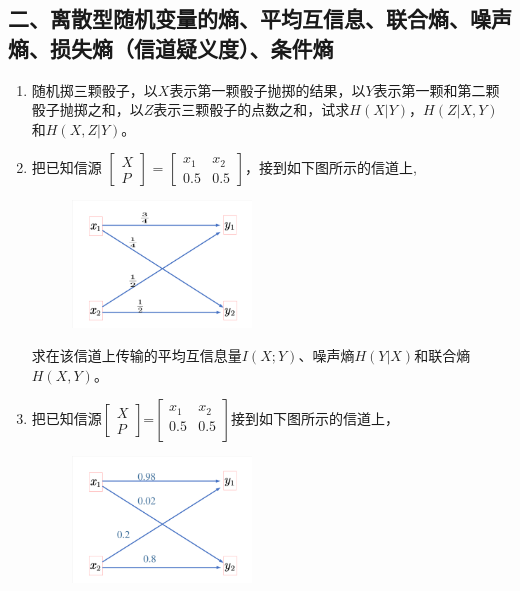 \documentclass[normal,cyan]{elegantnote}
\begin{document}
\subsection*{二、离散型随机变量的熵、平均互信息、联合熵、噪声熵、损失熵（信道疑义度）、条件熵}
\begin{enumerate}
    \item 随机掷三颗骰子，以$X$表示第一颗骰子抛掷的结果，以$Y$表示第一颗和第二颗骰子抛掷之和，以$Z$表示三颗骰子的点数之和，试求$H(X|Y)$，$H(Z|X,Y)$和$H(X,Z|Y)$。
    \vspace*{0.8cm}
    \item 把已知信源
    $
    \begin{bmatrix}
        X\\P
    \end{bmatrix}
    $  = $\begin{bmatrix}
        x_1 & x_2\\
        0.5 & 0.5 
    \end{bmatrix}$，接到如下图所示的信道上,
    \begin{figure}[H]
        \centering
        \includegraphics[width=0.45\textwidth]{figure/fig1.pdf}
    \end{figure}
    求在该信道上传输的平均互信息量$I(X;Y)$、噪声熵$H(Y|X)$和联合熵$H(X,Y)$。
    \vspace*{0.8cm}
    \item 把已知信源$\begin{bmatrix}
        X\\
        P
    \end{bmatrix}$=$\begin{bmatrix}
        x_1 & x_2\\
        0.5 & 0.5 \\
    \end{bmatrix}$接到如下图所示的信道上，
    \begin{figure}[H]
        \centering
        \includegraphics[width=0.45\textwidth]{figure/fig2.pdf}

\end{figure}
\end{enumerate}
\end{document}
